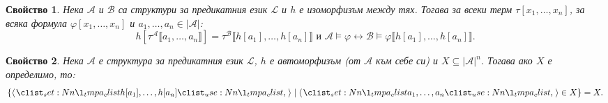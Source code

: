 \documentclass[12pt]{article}
\newcommand{\calA}{\mathcal{A}}
\newcommand{\calL}{\mathcal{L}}
\newcommand{\calB}{\mathcal{B}}
\newcommand{\db}[1]{\llbracket #1 \rrbracket}
\newtheorem*{property}{Свойство}
\theoremstyle{definition}
\begin{document}
\begin{property}
    Нека $\calA$ и $\calB$ са структури за предикатния език $\calL$ и $h$ е изоморфизъм между тях.
    Тогава за всеки терм $\tau[x_1, \dots, x_n]$, за всяка формула $\varphi[x_1, \dots, x_n]$ и $a_1, \dots, a_n \in |\calA|$:
    \[
        h[\tau^\calA\db{a_1, \dots, a_n}] = \tau^\calB\db{h[a_1], \dots, h[a_n]} \text{ и } \calA \models \varphi \longleftrightarrow \calB \models \varphi \db{h[a_1], \dots, h[a_n]}.
    \]
\end{property}

\begin{property}
    Нека $\calA$ е структура за предикатния език $\calL$, $h$ е автоморфизъм (от $\calA$ към себе си) и $X \subseteq |\calA|^n$.
    Тогава ако $X$ е определимо, то:
    \[
        \{ \opair{h[a_1], \dots, h[a_n]} \mid \opair{a_1, \dots, a_n} \in X \} = X.
    \]
\end{property}
\end{document}
